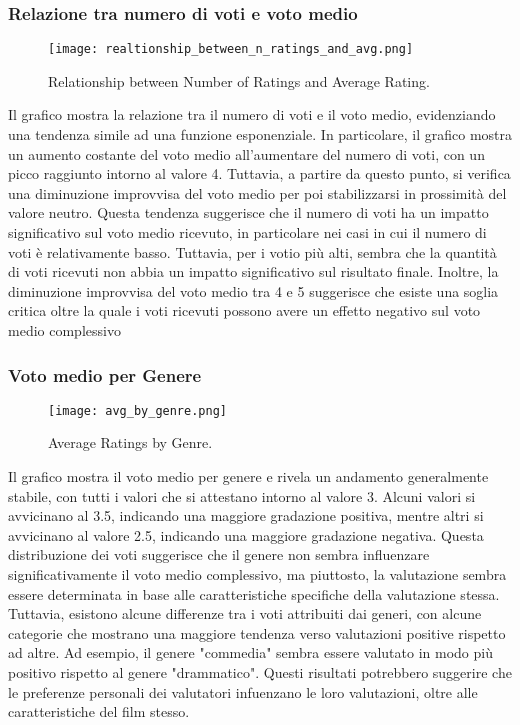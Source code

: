 \documentclass[../../Report.tex]{subfiles}
\begin{document}
\subsubsection{Relazione tra numero di voti e voto medio}
\begin{figure}[H]
    \centering
    \texttt{[image: realtionship\_between\_n\_ratings\_and\_avg.png]}
    \caption{Relationship between Number of Ratings and Average Rating.}
    \label{fig:realtionship_between_n_ratings_and_avg}
\end{figure}
Il grafico mostra la relazione tra il numero di voti e il voto medio, evidenziando una tendenza simile ad una funzione esponenziale.
In particolare, il grafico mostra un aumento costante del voto medio all'aumentare del numero di voti, con un picco raggiunto intorno al valore 4.
Tuttavia, a partire da questo punto, si verifica una diminuzione improvvisa del voto medio per poi stabilizzarsi in prossimità del valore neutro.
Questa tendenza suggerisce che il numero di voti ha un impatto significativo sul voto medio ricevuto, in particolare nei casi in cui il numero di voti è relativamente basso.
Tuttavia, per i votio più alti, sembra che la quantità di voti ricevuti non abbia un impatto significativo sul risultato finale. Inoltre, la diminuzione improvvisa del voto medio tra 4 e 5 suggerisce che esiste una soglia critica oltre la quale i voti ricevuti possono avere un effetto negativo sul voto medio complessivo


\subsubsection{Voto medio per Genere}
\begin{figure}[H]
    \centering
    \texttt{[image: avg\_by\_genre.png]}
    \caption{Average Ratings by Genre.}
    \label{fig:avg_by_genre}
\end{figure}
Il grafico mostra il voto medio per genere e rivela un andamento generalmente stabile, con tutti i valori che si attestano intorno al valore 3.
Alcuni valori si avvicinano al 3.5, indicando una maggiore gradazione positiva, mentre altri si avvicinano al valore 2.5, indicando una maggiore gradazione negativa.
Questa distribuzione dei voti suggerisce che il genere non sembra influenzare significativamente il voto medio complessivo, ma piuttosto, la valutazione sembra essere determinata in base alle caratteristiche specifiche della valutazione stessa.
Tuttavia, esistono alcune differenze tra i voti attribuiti dai generi, con alcune categorie che mostrano una maggiore tendenza verso valutazioni positive rispetto ad altre. 
Ad esempio, il genere "commedia" sembra essere valutato in modo più positivo rispetto al genere "drammatico". 
Questi risultati potrebbero suggerire che le preferenze personali dei valutatori infuenzano le loro valutazioni, oltre alle caratteristiche del film stesso.
\end{document}
